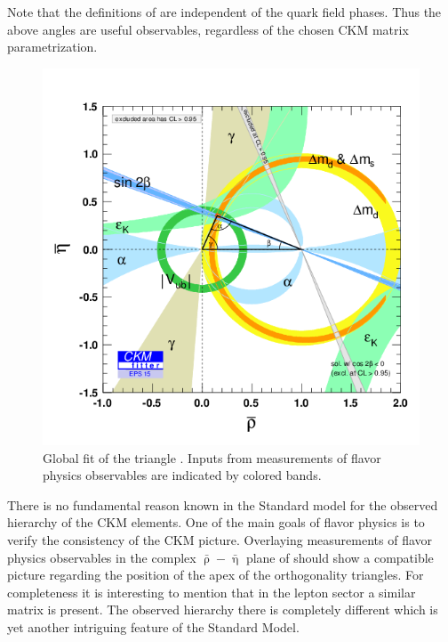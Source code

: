 \noindent Note that the definitions of  are independent of
the quark field phases. Thus the above angles are useful observables, regardless of the chosen
CKM matrix parametrization.

\begin{figure}[!h]
  \centering
    \includegraphics[trim=0cm 0.5cm 0cm 1.5cm, clip=true, width=\textwidth]{Figures/Chapter1/rhoeta_large.png}
    \caption{Global fit of the \Bd triangle \cite{ckm-fitter-phis-pred}.
             Inputs from measurements of flavor physics observables are indicated by colored bands.}
    \label{unitarity_triangle}
\end{figure}

There is no fundamental reason known in the Standard model for the observed hierarchy of the CKM elements.
One of the main goals of flavor physics is to verify the consistency of the CKM picture.
Overlaying measurements of flavor physics observables in the complex $\bar{\uprho}-\bar{\upeta}$ plane
of  should show a compatible picture regarding the position of the
apex of the orthogonality triangles. For completeness it is interesting to mention that in the
lepton sector a similar matrix is present. The observed hierarchy there is completely
different which is yet another intriguing feature of the Standard Model.

